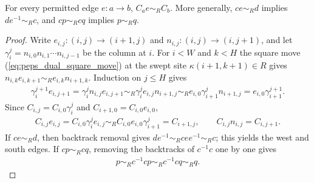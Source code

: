 \begin{lemma}%
    \label{thm:peps_dual_rectangle_comb}
    \leanok
    For every permitted edge $e:a\to b$, $C_a e\sim_R C_b$.
    More generally, $ce\sim_R d$ implies $de^{-1}\sim_R c$,
    and $cp\sim_R cq$ implies $p\sim_R q$.
\end{lemma}
\begin{proof}\leanok
    Write $e_{i,j}:(i,j)\to(i+1,j)$ and $n_{i,j}:(i,j)\to(i,j+1)$, and let
    $\gamma_i^j=n_{i,0}n_{i,1}\cdots n_{i,j-1}$ be the column at $i$.
    For $i<W$ and $k<H$ the square move (\ref{eq:peps_dual_square_move})
    at the swept site $\kappa(i+1,k+1)\in R$ gives
    $n_{i,k}e_{i,k+1}\sim_R e_{i,k}n_{i+1,k}$. Induction on $j\leq H$ gives
    \begin{align*}
        \gamma_i^{j+1}e_{i,j+1}
        =\gamma_i^j n_{i,j}e_{i,j+1}
        \sim_R\gamma_i^j e_{i,j}n_{i+1,j}
        \sim_R e_{i,0}\gamma_{i+1}^j n_{i+1,j}
        =e_{i,0}\gamma_{i+1}^{j+1}.
    \end{align*}
    Since $C_{i,j}=C_{i,0}\gamma_i^j$ and $C_{i+1,0}=C_{i,0}e_{i,0}$,
    \begin{align*}
        C_{i,j}e_{i,j}=C_{i,0}\gamma_i^je_{i,j}
        \sim_R C_{i,0}e_{i,0}\gamma_{i+1}^j=C_{i+1,j},
        \qquad
        C_{i,j}n_{i,j}=C_{i,j+1}.
    \end{align*}
    If $ce\sim_R d$, then backtrack removal gives
    $de^{-1}\sim_R cee^{-1}\sim_R c$; this yields the west and south edges.
    If $cp\sim_R cq$, removing the backtracks of $c^{-1}c$ one by one gives
    \begin{align*}
        p\sim_R c^{-1}cp\sim_R c^{-1}cq\sim_R q.
    \end{align*}
\end{proof}

